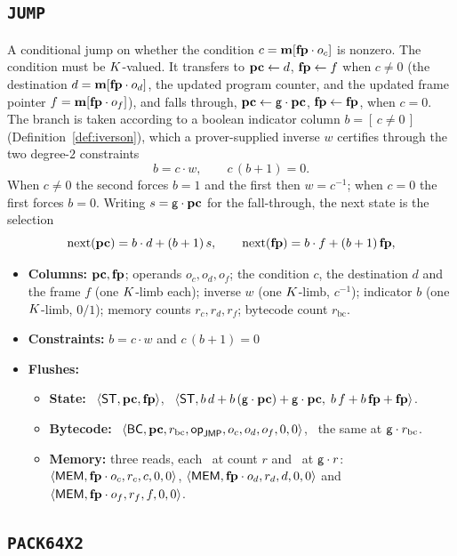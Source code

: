 \subsection{\texttt{JUMP}}\label{sec:tab-jump}

A conditional jump on whether the condition $c=\mathbf{m}[\mathbf{fp}\cdot o_c]$ is nonzero. The condition must be $K$-valued. It transfers to $\mathbf{pc}\gets d$, $\mathbf{fp}\gets f$ when $c\neq0$ (the destination $d=\mathbf{m}[\mathbf{fp}\cdot o_d]$, the updated program counter, and the updated frame pointer $f=\mathbf{m}[\mathbf{fp}\cdot o_f]$), and falls through, $\mathbf{pc}\gets\mathsf{g}\cdot\mathbf{pc}$, $\mathbf{fp}\gets\mathbf{fp}$, when $c=0$. The branch is taken according to a boolean indicator column $b=[\,c\neq0\,]$ (Definition~\ref{def:iverson}), which a prover-supplied inverse $w$ certifies through the two degree-$2$ constraints
\[
  b=c\cdot w,\qquad c\,(b+1)=0 .
\]
When $c\neq0$ the second forces $b=1$ and the first then $w=c^{-1}$; when $c=0$ the first forces $b=0$. Writing $s=\mathsf{g}\cdot\mathbf{pc}$ for the fall-through, the next state is the selection
\[
  \mathrm{next}(\mathbf{pc})=b\cdot d+(b+1)\,s,\qquad \mathrm{next}(\mathbf{fp})=b\cdot f+(b+1)\,\mathbf{fp},
\]
\begin{itemize}
\item \textbf{Columns:} $\mathbf{pc},\mathbf{fp}$; operands $o_c,o_d,o_f$; the condition $c$, the destination $d$ and the frame $f$ (one $K$-limb each); inverse $w$ (one $K$-limb, $c^{-1}$); indicator $b$ (one $K$-limb, $0/1$); memory counts $r_c,r_d,r_f$; bytecode count $r_{\mathrm{bc}}$.
\item \textbf{Constraints:}  $b=c\cdot w$ and $c\,(b+1)=0$
\item \textbf{Flushes:}
  \begin{itemize}
  \item \textbf{State:} \pull\ $\langle \mathsf{ST},\mathbf{pc},\mathbf{fp} \rangle$, \push\ $\langle \mathsf{ST},b\,d+b\,(\mathsf{g}\cdot\mathbf{pc})+\mathsf{g}\cdot\mathbf{pc},\;b\,f+b\,\mathbf{fp}+\mathbf{fp} \rangle$.
  \item \textbf{Bytecode:} \pull\ $\langle \mathsf{BC},\mathbf{pc},r_{\mathrm{bc}},\mathsf{op}_{\mathsf{JMP}},o_c,o_d,o_f,0,0 \rangle$, \push\ the same at $\mathsf{g}\cdot r_{\mathrm{bc}}$.
  \item \textbf{Memory:} three reads, each \pull\ at count $r$ and \push\ at $\mathsf{g}\cdot r$: $\langle \mathsf{MEM},\mathbf{fp}\cdot o_c,r_c,c,0,0 \rangle$, $\langle \mathsf{MEM},\mathbf{fp}\cdot o_d,r_d,d,0,0 \rangle$ and $\langle \mathsf{MEM},\mathbf{fp}\cdot o_f,r_f,f,0,0 \rangle$.
  \end{itemize}
\end{itemize}

\subsection{\texttt{PACK64X2}}\label{sec:tab-pack64x2}

